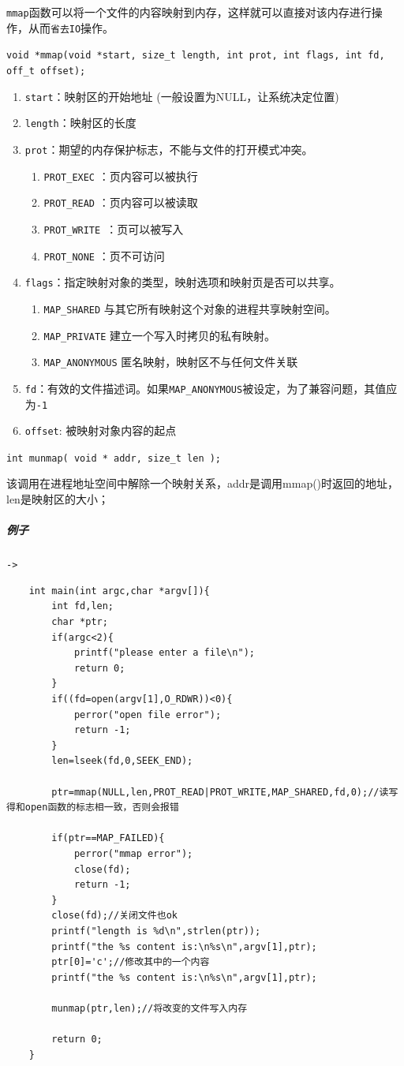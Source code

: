 \documentclass[UTF8,a4paper,12pt]{ctexbook}
\begin{document}
				\verb|mmap|函数可以将一个文件的内容映射到内存，这样就可以直接对该内存进行操作，从而\verb|省去IO|操作。
				
				\verb|void *mmap(void *start, size_t length, int prot, int flags, int fd, off_t offset);|
				
				\begin{enumerate}
					\item \verb|start|：映射区的开始地址 (一般设置为NULL，让系统决定位置)
					\item \verb|length|：映射区的长度
					\item \verb|prot|：期望的内存保护标志，不能与文件的打开模式冲突。
						\begin{enumerate}
							\item \verb|PROT_EXEC| ：页内容可以被执行
							\item \verb|PROT_READ| ：页内容可以被读取
							\item \verb|PROT_WRITE |：页可以被写入
							\item \verb|PROT_NONE| ：页不可访问
						\end{enumerate}
					\item \verb|flags|：指定映射对象的类型，映射选项和映射页是否可以共享。
						\begin{enumerate}
							\item \verb|MAP_SHARED| 与其它所有映射这个对象的进程共享映射空间。
							\item \verb|MAP_PRIVATE| 建立一个写入时拷贝的私有映射。
							\item \verb|MAP_ANONYMOUS| 匿名映射，映射区不与任何文件关联
						\end{enumerate}
					\item \verb|fd|：有效的文件描述词。如果\verb|MAP_ANONYMOUS|被设定，为了兼容问题，其值应为\verb|-1|
					\item \verb|offset|: 被映射对象内容的起点
				\end{enumerate}
		
				\verb|int munmap( void * addr, size_t len ); |
				
				该调用在进程地址空间中解除一个映射关系，addr是调用mmap()时返回的地址，len是映射区的大小；
				\subparagraph{例子}\verb|->|
				\begin{lstlisting}
	int main(int argc,char *argv[]){
		int fd,len;
		char *ptr;
		if(argc<2){
			printf("please enter a file\n");    
			return 0;
		}   
		if((fd=open(argv[1],O_RDWR))<0){
			perror("open file error");
			return -1; 
		}   
		len=lseek(fd,0,SEEK_END);   
		
		ptr=mmap(NULL,len,PROT_READ|PROT_WRITE,MAP_SHARED,fd,0);//读写得和open函数的标志相一致，否则会报错
		
		if(ptr==MAP_FAILED){
			perror("mmap error");
			close(fd);
			return -1; 
		}   
		close(fd);//关闭文件也ok
		printf("length is %d\n",strlen(ptr));
		printf("the %s content is:\n%s\n",argv[1],ptr);
		ptr[0]='c';//修改其中的一个内容
		printf("the %s content is:\n%s\n",argv[1],ptr);
		
		munmap(ptr,len);//将改变的文件写入内存
		
		return 0;
	}
				\end{lstlisting}
		
\end{document}
